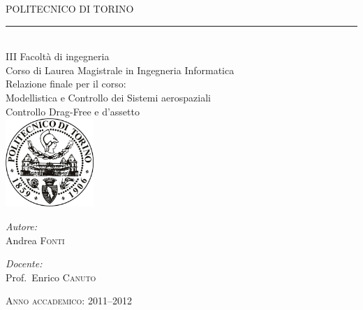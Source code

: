 \begin{titlepage}

\begin{center}
    
{\LARGE POLITECNICO DI TORINO}
\\
\rule{100pt}{0.5pt}
\\[1cm]
{\Large III Facoltà di ingegneria}\\
{Corso di Laurea Magistrale in Ingegneria Informatica}
\\[4cm]
{\LARGE Relazione finale per il corso:\\Modellistica e Controllo dei Sistemi
aerospaziali}\\[4cm]
{\Huge Controllo Drag-Free e d'assetto}\\[2.5cm]
\includegraphics[width=0.25\textwidth]{./logopolito}\\[2.5cm]

\begin{minipage}{0.4\textwidth}
\begin{flushleft} \large
\emph{Autore:}\\
Andrea \textsc{Fonti}
\end{flushleft}
\end{minipage}
\begin{minipage}{0.4\textwidth}
\begin{flushright} \large
\emph{Docente:} \\
Prof.~Enrico \textsc{Canuto}
\end{flushright}
\end{minipage}

\vfill

{\large \textsc{Anno accademico:} 2011--2012}

\end{center}

\end{titlepage}
